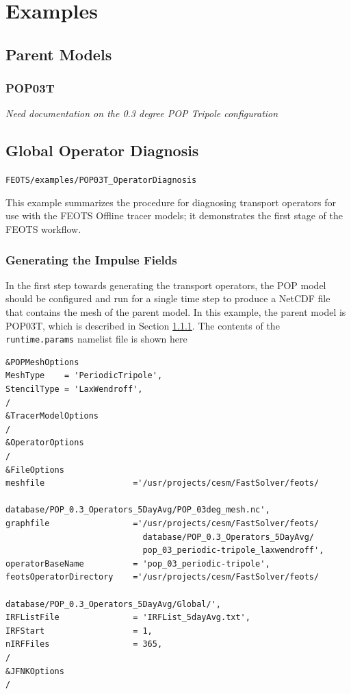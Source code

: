 \documentclass{softwaremanual}
\begin{document}
 
\chapter{Examples} \label{chapter:examples}

\section{Parent Models}
\subsection{POP03T} \label{sec:POP03T}
\textit{Need documentation on the 0.3 degree POP Tripole configuration}

\section{Global Operator Diagnosis}\label{sec:GlobalOperatorDiagnosis}
\begin{center}
\texttt{FEOTS/examples/POP03T\_OperatorDiagnosis}
\end{center}
This example summarizes the procedure for diagnosing transport operators for use with the FEOTS Offline tracer models; it demonstrates the first stage of the FEOTS workflow.

\subsection{Generating the Impulse Fields}
In the first step towards generating the transport operators, the POP model should be configured and run for a single time step to produce a NetCDF file that contains the mesh of the parent model. In this example, the parent model is POP03T, which is described in Section \ref{sec:POP03T}. The contents of the \texttt{runtime.params} namelist file is shown here 
\begin{verbatim}
&POPMeshOptions
MeshType    = 'PeriodicTripole',
StencilType = 'LaxWendroff',
/
&TracerModelOptions
/
&OperatorOptions
/
&FileOptions
meshfile                  ='/usr/projects/cesm/FastSolver/feots/
                            database/POP_0.3_Operators_5DayAvg/POP_03deg_mesh.nc',
graphfile                 ='/usr/projects/cesm/FastSolver/feots/
                            database/POP_0.3_Operators_5DayAvg/
                            pop_03_periodic-tripole_laxwendroff',
operatorBaseName          = 'pop_03_periodic-tripole',
feotsOperatorDirectory    ='/usr/projects/cesm/FastSolver/feots/
                            database/POP_0.3_Operators_5DayAvg/Global/',
IRFListFile               = 'IRFList_5dayAvg.txt',
IRFStart                  = 1,
nIRFFiles                 = 365,
/
&JFNKOptions
/
\end{verbatim}
\end{document}
